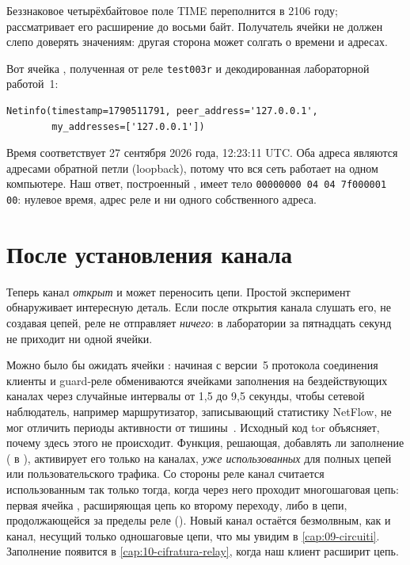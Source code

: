 Беззнаковое четырёхбайтовое поле TIME переполнится в 2106 году;  рассматривает его расширение до восьми байт. Получатель ячейки  не должен слепо доверять значениям: другая сторона может солгать о времени и адресах.

Вот ячейка , полученная от реле \texttt{test003r} и декодированная лабораторной работой~1:
\begin{lstlisting}[numbers=none]
Netinfo(timestamp=1790511791, peer_address='127.0.0.1',
        my_addresses=['127.0.0.1'])
\end{lstlisting}
Время соответствует 27 сентября 2026 года, 12:23:11 UTC. Оба адреса являются адресами обратной петли (loopback), потому что вся сеть работает на одном компьютере. Наш ответ, построенный , имеет тело \texttt{00000000 04 04 7f000001 00}: нулевое время, адрес реле и ни одного собственного адреса.

\section{После установления канала}\label{sec:canale-dopo}

Теперь канал \emph{открыт} и может переносить цепи. Простой эксперимент обнаруживает интересную деталь. Если после открытия канала слушать его, не создавая цепей, реле не отправляет \emph{ничего}: в лаборатории за пятнадцать секунд не приходит ни одной ячейки.

Можно было бы ожидать ячейки : начиная с версии~5 протокола соединения клиенты и guard-реле обмениваются ячейками заполнения на бездействующих каналах через случайные интервалы от 1,5 до 9,5 секунды, чтобы сетевой наблюдатель, например маршрутизатор, записывающий статистику NetFlow, не мог отличить периоды активности от тишины~. Исходный код tor объясняет, почему здесь этого не происходит. Функция, решающая, добавлять ли заполнение ( в ), активирует его только на каналах, \emph{уже использованных} для полных цепей или пользовательского трафика. Со стороны реле канал считается использованным так только тогда, когда через него проходит многошаговая цепь: первая ячейка , расширяющая цепь ко второму переходу, либо  в цепи, продолжающейся за пределы реле (). Новый канал остаётся безмолвным, как и канал, несущий только одношаговые цепи, что мы увидим в \cref{cap:09-circuiti}. Заполнение появится в \cref{cap:10-cifratura-relay}, когда наш клиент расширит цепь.

